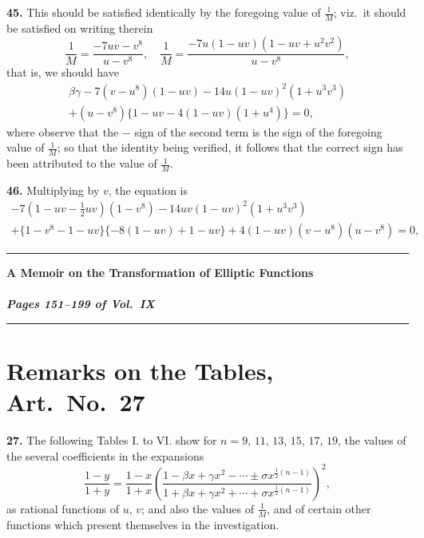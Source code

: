 \documentclass[11pt,a4paper]{book}
\begin{document}
\medskip
\noindent\textbf{45.} This should be satisfied identically by the foregoing value of $\frac{1}{M}$; viz.\ it should be satisfied on writing therein
\[
\frac{1}{M} = \frac{-7uv - v^8}{u - v^8}, \quad \frac{1}{M} = \frac{-7u(1 - uv)(1 - uv + u^2v^2)}{u - v^8},
\]
that is, we should have
\begin{multline*}
\beta\gamma - 7(v - u^8)(1 - uv) - 14u(1 - uv)^2(1 + u^3v^3) \\
+ (u - v^8)\{1 - uv - 4(1 - uv)(1 + u^4)\} = 0,
\end{multline*}
where observe that the $-$ sign of the second term is the sign of the foregoing value of $\frac{1}{M}$; so that the identity being verified, it follows that the correct sign has been attributed to the value of $\frac{1}{M}$.

\medskip
\noindent\textbf{46.} Multiplying by $v$, the equation is
\begin{multline*}
-7(1 - uv - \tfrac{1}{2}uv)(1 - v^8) - 14uv(1 - uv)^2(1 + u^3v^3) \\
+ \{1 - v^8 - 1 - uv\}\{-8(1 - uv) + 1 - uv\} + 4(1 - uv)(v - u^8)(u - v^8) = 0,
\end{multline*}


\vspace{2em}
\begin{center}
\rule{0.5\textwidth}{0.4pt}
\end{center}
\clearpage


\begin{center}
\Large\bfseries A Memoir on the Transformation of Elliptic Functions\\[0.5em]
\normalsize\mdseries [Paper 578]\\[0.5em]
\textit{Pages 151--199 of Vol.~IX}
\end{center}

\noindent\rule{\textwidth}{0.4pt}




\section*{Remarks on the Tables, Art.~No.~27}

\textbf{27.} The following Tables I. to VI. show for $n = 9$, $11$, $13$, $15$, $17$, $19$, the values of the several coefficients in the expansions
\[
\frac{1 - y}{1 + y} = \frac{1 - x}{1 + x}
\left(\frac{1 - \beta x + \gamma x^2 - \cdots \pm \sigma x^{\frac{1}{2}(n-1)}}
{1 + \beta x + \gamma x^2 + \cdots + \sigma x^{\frac{1}{2}(n-1)}}\right)^2,
\]
as rational functions of $u$, $v$; and also the values of $\frac{1}{M}$, and of certain other functions which present themselves in the investigation.
\end{document}
